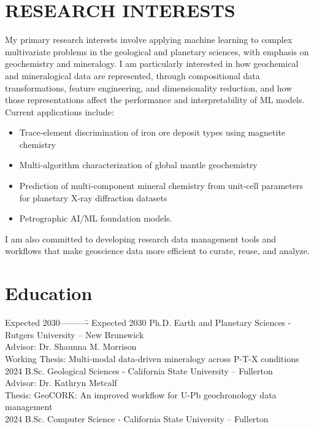 \documentclass{res} %
\begin{document}
\begin{resume}
\section{\Large{RESEARCH INTERESTS}}
My primary research interests involve applying machine learning to complex multivariate problems in the geological and planetary sciences, with emphasis on geochemistry and mineralogy. I am particularly interested in how geochemical and mineralogical data are represented, through compositional data transformations, feature engineering, and dimensionality reduction, and how those representations affect the performance and interpretability of ML models. Current applications include: \vspace{4pt}
\begin{itemize}
    \item Trace-element discrimination of iron ore deposit types using magnetite chemistry
    \item Multi-algorithm characterization of global mantle geochemistry
    \item Prediction of multi-component mineral chemistry from unit-cell parameters for planetary X-ray diffraction datasets
    \item Petrographic AI/ML foundation models.
\end{itemize} \vspace{-6pt}
I am also committed to developing research data management tools and workflows that make geoscience data more efficient to curate, reuse, and analyze.
\section{\Large{Education}} 
\vspace{-6pt}

\begin{tabbing}
Expected 2030----------\= \kill
Expected 2030 \> Ph.D. Earth and Planetary Sciences - Rutgers University -- New Brunswick \\ \> Advisor: Dr. Shaunna M. Morrison \\\> Working Thesis: Multi-modal data-driven mineralogy across P-T-X conditions \\
[6pt]
2024 \> B.Sc. Geological Sciences - California State University -- Fullerton \\ \> Advisor: Dr. Kathryn Metcalf \\\> Thesis: GeoCORK: An improved workflow for U-Pb geochronology data management \\ 
[6pt]
2024 \> B.Sc. Computer Science - California State University -- Fullerton \\ 
\end{tabbing}
\vspace{-22pt}


\end{resume}
\end{document}

